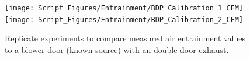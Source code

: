 \documentclass[12pt,oneside]{book}
\begin{document}
\clearpage

\begin{figure}[!ht]
\texttt{[image: Script\_Figures/Entrainment/BDP\_Calibration\_1\_CFM]} 
\texttt{[image: Script\_Figures/Entrainment/BDP\_Calibration\_2\_CFM]} 
\caption[Air Entrainment with Known Source: Blower Door Test with Double Door Exhaust]{Replicate experiments to compare measured air entrainment values to a blower door (known source) with an double door exhaust.}
\label{fig:blower_double_door}
\end{figure}
\end{document}
